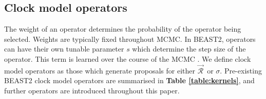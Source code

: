 \documentclass[10pt,letterpaper]{article}
\begin{document}
\subsection*{Clock model operators}
\label{sect:clockModelOperators}

The weight of an operator determines the probability of the operator being selected.
Weights are typically fixed throughout MCMC.
In BEAST2, operators can have their own tunable parameter $s$ which determine the step size of the operator.
This term is learned over the course of the MCMC \cite{rosenthal2011optimal, bouckaert2019beast}. 
We define clock model operators as those which generate proposals for either $\vec{\mathcal{R}}^{\,}$ or $\sigma$.
Pre-existing BEAST2 clock model operators are summarised in \textbf{Table \ref{table:kernels}}, and further operators are introduced throughout this paper.
\end{document}
